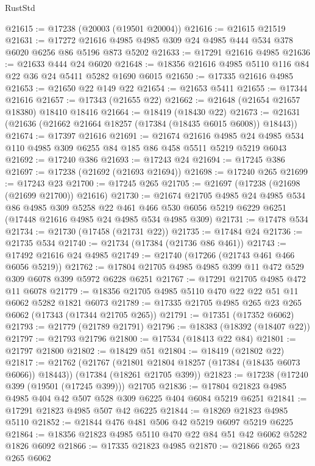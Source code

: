 \begin{lexlean}{RustStd}
\begin{coremodule}
@21615 := @17238 (@20003 (@19501 @20004))
@21616 := @21615 @21519
@21631 := @17272 @21616 @4985 @4985 @309 @24 @4985 @444 @534 @378 @6020 @6256 @86 @5196 @873 @5202
@21633 := @17291 @21616 @4985
@21636 := @21633 @444 @24 @6020
@21648 := @18356 @21616 @4985 @5110 @116 @84 @22 @36 @24 @5411 @5282 @1690 @6015
@21650 := @17335 @21616 @4985
@21653 := @21650 @22 @149 @22
@21654 := @21653 @5411
@21655 := @17344 @21616
@21657 := @17343 (@21655 @22)
@21662 := @21648 (@21654 @21657 @18380) @18410 @18416
@21664 := @18419 (@18430 @22)
@21673 := @21631 (@21636 (@21662 @21664 @18257 (@17384 (@18435 @6015 @6008)) @18443))
@21674 := @17397 @21616
@21691 := @21674
    @21616
    @4985
    @24
    @4985
    @534
    @110
    @4985
    @309
    @6255
    @84
    @185
    @86
    @458
    @5511
    @5219
    @5219
    @6043
@21692 := @17240 @386
@21693 := @17243 @24
@21694 := @17245 @386
@21697 := @17238 (@21692 (@21693 @21694))
@21698 := @17240 @265
@21699 := @17243 @23
@21700 := @17245 @265
@21705 := @21697 (@17238 (@21698 (@21699 @21700)) @21616)
@21730 := @21674
    @21705
    @4985
    @24
    @4985
    @534
    @86
    @4985
    @309
    @5258
    @22
    @461
    @466
    @530
    @6056
    @5219
    @6229
    @6251
    (@17448 @21616 @4985 @24 @4985 @534 @4985 @309)
@21731 := @17478 @534
@21734 := @21730 (@17458 (@21731 @22))
@21735 := @17484 @24
@21736 := @21735 @534
@21740 := @21734 (@17384 (@21736 @86 @461))
@21743 := @17492 @21616 @24 @4985
@21749 := @21740 (@17266 (@21743 @461 @466 @6056 @5219))
@21762 := @17804 @21705 @4985 @4985 @399 @11 @472 @529 @309 @6078 @399 @5972 @6228 @6251
@21767 := @17291 @21705 @4985 @472 @11 @6078
@21779 := @18356 @21705 @4985 @5110 @470 @22 @22 @51 @11 @6062 @5282 @1821 @6073
@21789 := @17335 @21705 @4985 @265 @23 @265 @6062 (@17343 (@17344 @21705 @265))
@21791 := @17351 (@17352 @6062)
@21793 := @21779 (@21789 @21791)
@21796 := @18383 (@18392 (@18407 @22))
@21797 := @21793 @21796
@21800 := @17534 (@18413 @22 @84)
@21801 := @21797 @21800
@21802 := @18429 @51
@21804 := @18419 (@21802 @22)
@21817 := @21762
    (@21767 (@21801 @21804 @18257 (@17384 (@18435 @6073 @6066)) @18443))
    (@17384 (@18261 @21705 @399))
@21823 := @17238 (@17240 @399 (@19501 (@17245 @399))) @21705
@21836 := @17804 @21823 @4985 @4985 @404 @42 @507 @528 @309 @6225 @404 @6084 @5219 @6251
@21841 := @17291 @21823 @4985 @507 @42 @6225
@21844 := @18269 @21823 @4985 @5110
@21852 := @21844 @476 @481 @506 @42 @5219 @6097 @5219 @6225
@21864 := @18356 @21823 @4985 @5110 @470 @22 @84 @51 @42 @6062 @5282 @1826 @6092
@21866 := @17335 @21823 @4985
@21870 := @21866 @265 @23 @265 @6062

\end{coremodule}
\end{lexlean}
